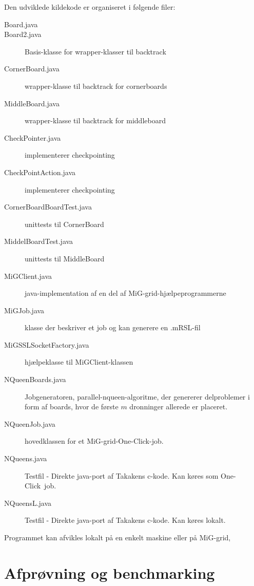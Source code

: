 \documentclass[pdf,draft,a4paper,10pt]{article}
\newcommand{\mig}{MiG}
\newcommand{\oc}{One-Click}
\begin{document}
Den udviklede kildekode er organiseret i følgende filer:
\begin{description}
	\item[Board.java] 
	\item[Board2.java] Basis-klasse for wrapper-klasser til backtrack
	\item[CornerBoard.java] wrapper-klasse til backtrack for cornerboards
	\item[MiddleBoard.java] wrapper-klasse til backtrack for middleboard
	\item[CheckPointer.java] implementerer checkpointing
	\item[CheckPointAction.java] implementerer checkpointing
	\item[CornerBoardBoardTest.java] unittests til CornerBoard
	\item[MiddelBoardTest.java] unittests til MiddleBoard
	\item[MiGClient.java] java-implementation af en del af \mig-grid-hjælpeprogrammerne
	\item[MiGJob.java] klasse der beskriver et job og kan generere en .mRSL-fil
	\item[MiGSSLSocketFactory.java] hjælpeklasse til MiGClient-klassen
	\item[NQueenBoards.java] Jobgeneratoren, parallel-nqueen-algoritme, der genererer delproblemer i form af boards, hvor de første $m$ dronninger allerede er placeret. 
	\item[NQueenJob.java] hovedklassen for et \mig-grid-\oc-job. 
	\item[NQueens.java] Testfil - Direkte java-port af Takakens c-kode. Kan køres som \oc\ job.
	\item[NQueensL.java] Testfil - Direkte java-port af Takakens c-kode. Kan køres lokalt.
\end{description}

Programmet kan afvikles lokalt på en enkelt maskine eller på \mig-grid,  



\section{Afprøvning og benchmarking}
\end{document}

